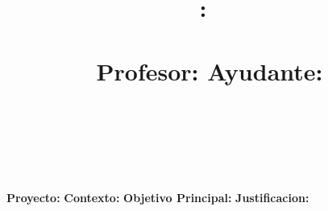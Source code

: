 \documentclass{article}
\title{
\textmd{\textbf{\tareaRamo:\ \tareaTitulo}}\\
\normalsize\vspace{0.1in}\small{\tareaFecha}\\
\vspace{0.1in}\large{Profesor: \textit{\tareaProfesor} \qquad \qquad Ayudante: \textit{\tareaAyudante}}
}
\author{
    \textbf{\tareaAlumnoUno} \\
    \small{\tareaRolUno}
    \and
    \textbf{\tareaAlumnoDos} \\
    \small{\tareaRolDos}}
\date{}
\begin{document}
\maketitle

\textbf{Proyecto:} 
\textbf{Contexto:} 
\textbf{Objetivo Principal:} 
\textbf{Justificacion:} 
\end{document}
